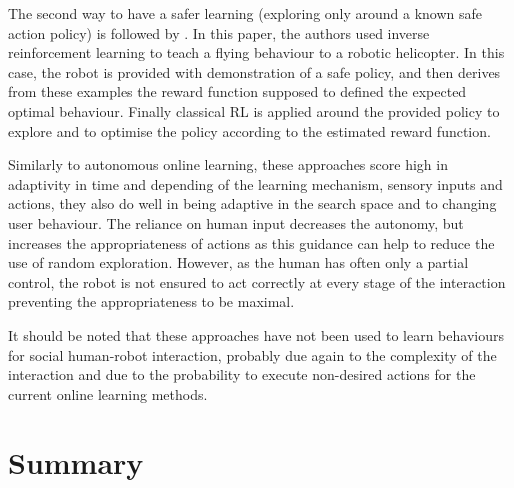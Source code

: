     The second way to have a safer learning (exploring only around a known safe
    action policy) is followed by \citet{Abbeel2004}. In this paper, the authors
    used inverse reinforcement learning to teach a flying behaviour to a robotic
    helicopter. In this case, the robot is provided with demonstration of a safe
    policy, and then derives from these examples the reward function supposed to
    defined the expected optimal behaviour. Finally classical RL is applied
    around the provided policy to explore and to optimise the policy according
    to the estimated reward function.

    Similarly to autonomous online learning, these approaches score high in
    adaptivity in time and depending of the learning mechanism, sensory inputs
    and actions, they also do well in being adaptive in the search space and to
    changing user behaviour. The reliance on human input decreases the autonomy,
    but increases the appropriateness of actions as this guidance can help to
    reduce the use of random exploration. However, as the human has often only a
    partial control, the robot is not ensured to act correctly at every stage of
    the interaction preventing the appropriateness to be maximal. 

    It should be noted that these approaches have not been used to learn
    behaviours for social human-robot interaction, probably due again to the
    complexity of the interaction and due to the probability to execute
    non-desired actions for the current online learning methods.
	



\section{Summary}
